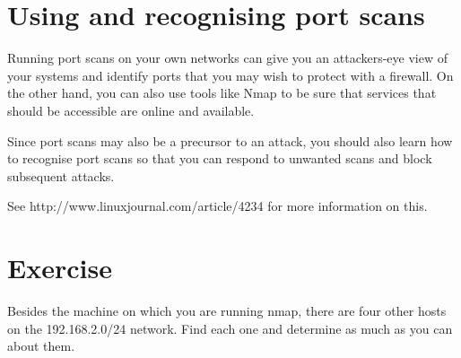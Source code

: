 \documentclass{article}
\begin{document}
\section{Using and recognising port scans}
Running port scans on your own networks can give you an attackers-eye view of your systems and identify ports that you may wish to protect with a firewall.  On the other hand, you can also use tools like Nmap to be sure that services that should be accessible are online and available.

Since port scans may also be a precursor to an attack, you should also learn how to recognise port scans so that you can respond to unwanted scans and block subsequent attacks.  

See http://www.linuxjournal.com/article/4234 for more information on this.

 
\section{Exercise}
Besides the machine on which you are running nmap, there are four other hosts on the 192.168.2.0/24 network.  Find each one and determine as much as you can about them.
\end{document}
